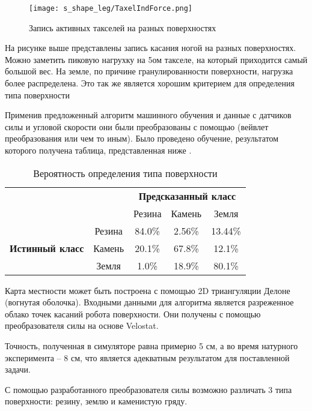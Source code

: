 \begin{figure}[H]
    \centering\texttt{[image: s\_shape\_leg/TaxelIndForce.png]}
    \caption{Запись активных такселей на разных поверхностях}
    \label{fig:s_shape_leg/TaxelIndForce_full.png}
\end{figure}

На рисунке выше  представлены запись касания ногой на разных поверхностях. Можно заметить пиковую нагрухку на 5ом такселе, на который приходится самый большой вес. На земле, по причине гранулированности поверхности, нагрузка более распределена. Это так же является хорошим критерием для определения типа поверхности

Применив предложенный алгоритм машинного обучения и данные с датчиков силы и угловой скорости они были преобразованы с помощью (вейвлет преобразования или чем то иным). Было проведено обучение, результатом которого получена таблица, представленная ниже .

\begin{table}[H]
    \caption{Вероятность определения типа поверхности}
    \label{tabular:prob_terrain_classification}
    \centering
\begin{tabular}{|c|c|c|c|c|} 
    \cline{3-5}
    \multicolumn{1}{l}{} & \multicolumn{1}{l|}{} & \multicolumn{3}{c|}{\textbf{Предсказанный класс}} \\ 
    \cline{3-5}
    \multicolumn{1}{l}{} &  & Резина & Камень & Земля \\ 
    \hline
    \multirow{3}{*}{{\textbf{Истинный класс}}} & Резина & {\cellcolor[rgb]{0.741,0.843,0.929}}84.0\% & 2.56\% & 13.44\% \\ 
    \hhline{|~----|}
     & Камень & 20.1\% & {\cellcolor[rgb]{0.741,0.843,0.929}}67.8\% & 12.1\% \\ 
    \hhline{|~----|}
     & Земля & 1.0\% & 18.9\% & {\cellcolor[rgb]{0.741,0.843,0.929}}80.1\% \\
    \hline
    \end{tabular}
\end{table}

Карта местности может быть построена с помощью 2D триангуляции Делоне (вогнутая оболочка). Входными данными для алгоритма является разреженное облако точек касаний робота поверхности. Они получены с помощью преобразователя силы на основе Velostat.

Точность, полученная в симуляторе равна примерно 5 см, а во время натурного эксперимента -- 8 см, что является адекватным результатом для поставленной задачи.

С помощью разработанного преобразователя силы возможно различать 3 типа поверхности: резину, землю и каменистую гряду.